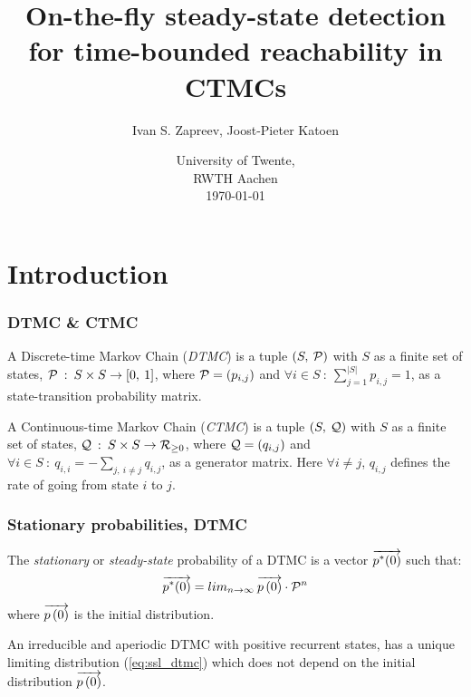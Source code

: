 \documentclass{beamer}
\title{On-the-fly steady-state detection for time-bounded reachability in CTMCs}
\author{Ivan S. Zapreev, Joost-Pieter Katoen}
\date{ University of Twente,\\
	RWTH Aachen\\
	{\tiny \today}
}
\begin{document}


\frame{\titlepage}

\section[Outline]{}
\frame{\tableofcontents}

\section{Introduction}	


\frame
{
	\frametitle{DTMC \& CTMC}
	\begin{definition}
			A Discrete-time Markov Chain (\emph{DTMC}) is a tuple $\left( S,\: \mathcal{P} \right)$ with $S$ as a finite set of states, $\mathcal{P} \: : \: S \times S \rightarrow \left[0,\:1 \right]$, where $\mathcal{P}=\left(p_{i,j}\right)$ and $\forall i \in S \: : \: \sum_{j=1}^{|S|}	p_{i,j}=1$,	as a state-transition probability matrix.
	\end{definition}
	\begin{definition}
			A Continuous-time Markov Chain (\emph{CTMC}) is a tuple $\left( S,\: \mathcal{Q} \right)$ with $S$ as a finite set of states, $\mathcal{Q} \: : \: S \times S \rightarrow \mathcal{R}_{\geq 0}$, where $\mathcal{Q}=\left(q_{i,j}\right)$ and $\forall i \in S \: : \: q_{i,i} = -\sum_{j, \: i \neq j} q_{i,j}$, as a generator matrix.
			Here $\forall i \neq j$, $q_{i,j}$ defines the rate of going from state $i$ to $j$.
	\end{definition}
}

\frame
{
	\frametitle{Stationary probabilities, DTMC \cite{Haverkort_98}}
	\begin{definition}
			The \emph{stationary} or \emph{steady-state} probability of a DTMC is a vector $\overrightarrow{p^{*}(0)}$ such that:
			\begin{equation}
				\overrightarrow{p^{*}(0)} = lim_{n \to \infty} \: \overrightarrow{p \left( 0 \right)} \cdot \mathcal{P}^{n}
				\label{eq:ssl_dtmc}
			\end{equation}
			where $\overrightarrow{p \left( 0 \right)}$ is the initial distribution.
	\end{definition}
	\begin{theorem}
			An irreducible and aperiodic DTMC with positive recurrent states, has a unique limiting distribution (\ref{eq:ssl_dtmc}) which does not depend on the initial distribution $\overrightarrow{p \left( 0 \right)}$.
	\end{theorem}
}
\end{document}
